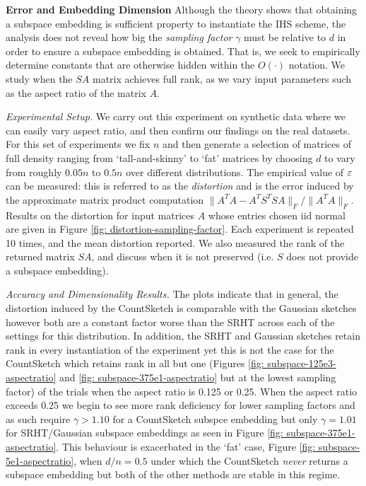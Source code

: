 \medskip
\noindent\textbf{Error and Embedding Dimension}
Although the theory shows that obtaining a subspace embedding is
sufficient property to instantiate the IHS scheme,
the analysis does not reveal how big the \textit{sampling factor}
$\gamma$ must be relative to $d$ in order to ensure a subspace
embedding is obtained.
That is, we seek to empirically determine constants that are otherwise
hidden within the $O(\cdot)$ notation. 
We study when the $SA$ matrix achieves full rank, as we vary input
parameters such as the aspect ratio of the matrix $A$. 

\textit{Experimental Setup.}
We carry out this experiment on synthetic data where we can easily
vary aspect ratio, and then confirm our findings on the real
datasets.
For this set of experiments we fix $n$ and then generate a selection of matrices
of full density
ranging from `tall-and-skinny' to `fat' matrices by choosing $d$ to vary
from roughly $0.05n$ to $0.5n$ over different distributions.
The empirical value of $\varepsilon$ can be measured: this is referred to as the
\textit{distortion} and is the error induced by the approximate matrix product
computation $\|A^T A - A^T S^T S A \|_F/\|A^TA\|_F$.
Results on the distortion for input matrices $A$ whose entries chosen iid normal are given
in Figure \ref{fig: distortion-sampling-factor}.
Each experiment is repeated 10 times, and the mean distortion reported.
We also measured the rank of the returned matrix $SA$, and discuss
when it is not preserved (i.e. $S$ does not provide a subspace
embedding). 

\textit{Accuracy and Dimensionality Results.}
The plots indicate that in general, the distortion induced by the CountSketch is
comparable with the Gaussian sketches however both are a constant factor worse
than the SRHT across each of the settings for this distribution.
In addition, the SRHT and Gaussian sketches retain rank in every instantiation
of the experiment yet this is not the case for the CountSketch which retains
rank in all but one (Figures \ref{fig: subspace-125e3-aspectratio} and \ref{fig: subspace-375e1-aspectratio} but at the lowest
sampling factor) of the trials when the aspect ratio is 0.125 or 0.25.
When the aspect ratio exceeds 0.25 we begin to see more rank deficiency for
lower sampling factors and as such require $\gamma > 1.10$ for a CountSketch
subspce embedding but only $\gamma = 1.01$ for SRHT/Gaussian subspace embeddings as
seen in Figure \ref{fig: subspace-375e1-aspectratio}.
This behaviour is exacerbated in the `fat' case, Figure \ref{fig: subspace-5e1-aspectratio},
when $d/n = 0.5$ under which the CountSketch \textit{never} returns a subspace
embedding but both of the other methods are stable in this regime.


